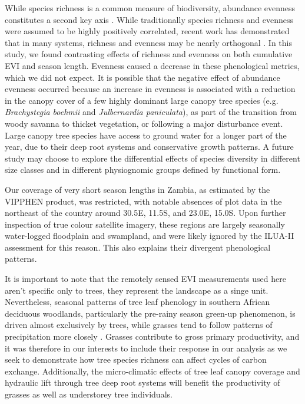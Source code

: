 \documentclass[11pt,a4paper]{article}
\begin{document}
While species richness is a common measure of biodiversity, abundance evenness
constitutes a second key axis \citep{Wilsey2005, Hillebrand2008}. While
traditionally species richness and evenness were assumed to be highly positively
correlated, recent work has demonstrated that in many systems, richness and
evenness may be nearly orthogonal \citep{}. In this study, we found contrasting
effects of richness and evenness on both cumulative EVI and season length.
Evenness caused a decrease in these phenological metrics, which we did not
expect. It is possible that the negative effect of abundance evenness occurred
because an increase in evenness is associated with a reduction in the canopy
cover of a few highly dominant large canopy tree species (e.g.
\textit{Brachystegia boehmii} and \textit{Julbernardia paniculata}), as part of
the transition from woody savanna to thicket vegetation, or following a major
disturbance event. Large canopy tree species have access to ground water for a
longer part of the year, due to their deep root systems and conservative growth
patterns. A future study may choose to explore the differential effects of
species diversity in different size classes and in different physiognomic groups
defined by functional form.

Our coverage of very short season lengths in Zambia, as estimated by the VIPPHEN
product, was restricted, with notable absences of plot data in the northeast of
the country around 30.5\textdegree{}E, 11.5\textdegree{}S, and
23.0\textdegree{}E, 15.0\textdegree{}S. Upon further inspection of true colour
satellite imagery, these regions are largely seasonally water-logged floodplain
and swampland, and were likely ignored by the ILUA-II assessment for this
reason. This also explains their divergent phenological patterns. 

It is important to note that the remotely sensed EVI measurements used here
aren't specific only to trees, they represent the landscape as a singe unit.
Nevertheless, seasonal patterns of tree leaf phenology in southern African
deciduous woodlands, particularly the pre-rainy season green-up phenomenon, is
driven almost exclusively by trees, while grasses tend to follow patterns of
precipitation more closely \citep{}. Grasses contribute to gross primary
productivity, and it was therefore in our interests to include their response in
our analysis as we seek to demonstrate how tree species richness can affect
cycles of carbon exchange. Additionally, the micro-climatic effects of tree leaf
canopy coverage and hydraulic lift through tree deep root systems will benefit
the productivity of grasses as well as understorey tree individuals.
\end{document}
